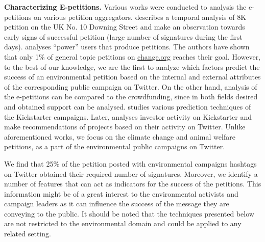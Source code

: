 \textbf{Characterizing E-petitions.} Various works were conducted to analysis the e-petitions on various petition aggregators.
\cite{Hale2013} describes a temporal analysis of 8K petition on the UK No. 10 Downing Street and make an observation towards early signs of successful petition (large number of signatures during the first days).
\cite{Huang2015} analyses ``power'' users that produce petitions. The authors have shown that only 1\% of general topic petitions on \url{change.org} reaches their goal.
However, to the best of our knowledge, we are the first to analyze which factors predict the success of an environmental petition based on the internal and external attributes of the corresponding public campaign on Twitter.
On the other hand, analysis of the e-petitions can be compared to the crowdfunding, since in both fields desired and obtained support can be analysed. \cite{Etter2013} studies various prediction techniques of the Kickstarter campaigns.
Later, \cite{An2014} analyses investor activity on Kickstarter and make recommendations of projects based on their activity on Twitter. Unlike aforementioned works, we focus on the climate change and animal welfare petitions, as a part of the environmental public campaigns on Twitter.


We find that 25\% of the petition posted with environmental campaigns hashtags on Twitter obtained their required number of signatures.
Moreover, we identify a number of features that can act as indicators for the success of the petitions.
This information might be of a great interest to the environmental activists and campaign leaders as it can influence the success of the message they are conveying to the public.
It should be noted that the techniques presented below are not restricted to the environmental domain and could be applied to any related setting.

